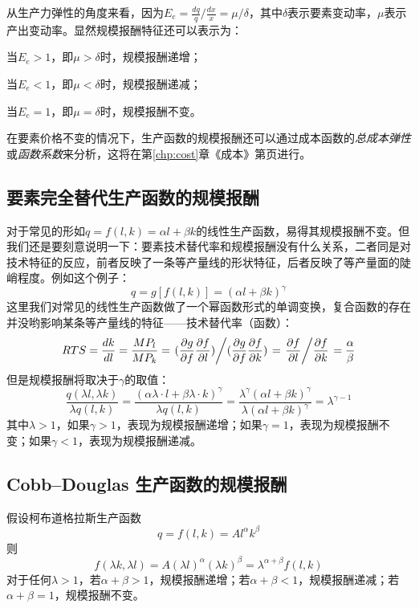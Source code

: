 从生产力弹性的角度来看，因为$E_e = \frac{dq}{q} / \frac{dx}{x} = {\mu}/{\delta}$，其中$\delta$表示要素变动率，$\mu$表示产出变动率。显然规模报酬特征还可以表示为：
\begin{compactitem}
\item 当$E_e>1$，即$\mu > \delta$时，规模报酬递增；
\item 当$E_e<1$，即$\mu < \delta$时，规模报酬递减；
\item 当$E_e=1$，即$\mu = \delta$时，规模报酬不变。
\end{compactitem}

在要素价格不变的情况下，生产函数的规模报酬还可以通过成本函数的\emph{总成本弹性}或\emph{函数系数}来分析，这将在第\ref{chp:cost}章《成本》第\pageref{eq:total-cost-elasticity}页进行。

\subsection{要素完全替代生产函数的规模报酬}
\label{subsec:returns-to-scale-of-linear-production-function}

对于常见的形如$q=f(l,k)=\alpha l + \beta k$的线性生产函数，易得其规模报酬不变。但我们还是要刻意说明一下：要素技术替代率和规模报酬没有什么关系，二者同是对技术特征的反应，前者反映了一条等产量线的形状特征，后者反映了等产量面的陡峭程度。例如这个例子：
\[
q=g[f(l,k)]=(\alpha l + \beta k)^{\gamma}
\]
这里我们对常见的线性生产函数做了一个幂函数形式的单调变换，复合函数的存在并没哟影响某条等产量线的特征——技术替代率（函数）：
\[
RTS = \frac{{dk}}{{dl}}
= \frac{{M{P_l}}}{{M{P_k}}}
= \left. {(\frac{{\partial g}}{{\partial f}}\frac{{\partial f}}{{\partial l}})} \middle/ {(\frac{{\partial g}}{{\partial f}}\frac{{\partial f}}{{\partial k}})} \right.
= \left. {\frac{{\partial f}}{{\partial l}}} \middle/ {\frac{{\partial f}}{{\partial k}}} \right.
= \frac{\alpha }{\beta }
\]
但是规模报酬将取决于$\gamma$的取值：
\[\frac{{q(\lambda l,\lambda k)}}{{\lambda q(l,k)}} = \frac{{{{(\alpha \lambda \cdot l + \beta \lambda \cdot k)}^\gamma }}}{{\lambda q(l,k)}} = \frac{{{\lambda ^\gamma }{{(\alpha l + \beta k)}^\gamma }}}{{\lambda {{(\alpha l + \beta k)}^\gamma }}} = {\lambda ^{\gamma  - 1}}\]
其中$\lambda > 1$，如果$\gamma>1$，表现为规模报酬递增；如果$\gamma=1$，表现为规模报酬不变；如果$\gamma<1$，表现为规模报酬递减。

\subsection{Cobb--Douglas 生产函数的规模报酬}
假设柯布道格拉斯生产函数
\begin{equation}
q = f(l,k)=A{l^\alpha }{k^\beta }
\end{equation}
则
\begin{equation}
f(\lambda k,\lambda l) = A{(\lambda l)^\alpha }{(\lambda k)^\beta } = {\lambda^{\alpha+\beta}}f(l,k)
\end{equation}
对于任何$\lambda > 1$，若$\alpha + \beta > 1$，规模报酬递增；若$\alpha + \beta < 1$，规模报酬递减；若$\alpha + \beta = 1$，规模报酬不变。

